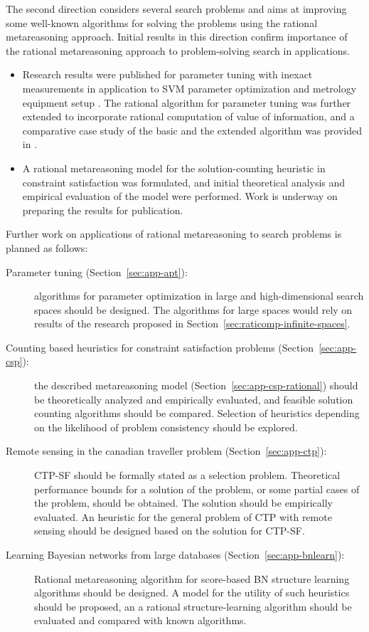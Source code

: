 The second direction considers several search problems and aims at
improving some well-known algorithms for solving the problems
using the rational metareasoning approach. Initial results in this
direction confirm importance of the rational metareasoning approach to
problem-solving search in applications.
 \begin{itemize}
\item Research results were published for parameter tuning with
inexact measurements in application to SVM parameter optimization and
metrology equipment setup \cite{TolpinShimony.blinkered}. The rational
algorithm for parameter tuning was further extended to incorporate
rational computation of value of information, and a comparative case
study of the basic and the extended algorithm was provided in
\cite{Tolpin.raticomp}.
\item A rational metareasoning model for the solution-counting
heuristic in constraint satisfaction was formulated, and initial
theoretical analysis and empirical evaluation of the model were
performed. Work is underway on preparing the results for publication.
\end{itemize}
Further work on applications of rational metareasoning to search
problems is planned as follows:
\begin{description}
\item[Parameter tuning (Section~\ref{sec:app-apt}):] algorithms for
  parameter optimization in large and high-dimensional search spaces
  should be designed. The algorithms for large spaces
  would rely on results of the research proposed in
  Section~\ref{sec:raticomp-infinite-spaces}.
\item[Counting based heuristics for constraint satisfaction problems
  (Section~\ref{sec:app-csp}):] the described metareasoning model
  (Section~\ref{sec:app-csp-rational}) should be theoretically analyzed
  and empirically evaluated, and feasible solution counting algorithms
  should be compared. Selection of heuristics depending on the
  likelihood of problem consistency should be explored.
\item[Remote sensing in the canadian traveller problem
  (Section~\ref{sec:app-ctp}):] CTP-SF should be formally
  stated as a selection problem. Theoretical performance bounds
  for a solution of the problem, or some partial cases of the problem, should be
  obtained. The solution should be empirically evaluated. An heuristic
  for the general problem of CTP with remote sensing should be designed
  based on the solution for CTP-SF.
\item[Learning Bayesian networks from large databases
  (Section~\ref{sec:app-bnlearn}):] Rational metareasoning algorithm for
  score-based BN structure learning algorithms should be designed. A model for
  the utility of such heuristics should be proposed, an a rational
  structure-learning algorithm should be evaluated and compared with
  known algorithms.
\end{description}

